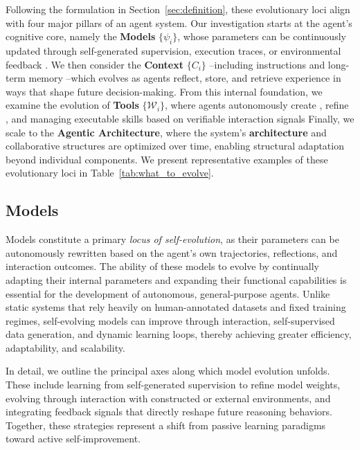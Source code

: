 \documentclass[10pt]{article} %
\begin{document}
Following the formulation in Section~\ref{sec:definition}, 
these evolutionary loci align with four major pillars of an agent system.
Our investigation starts at the agent's cognitive core, namely the \textbf{Models} 
$\{\psi_i\}$,
whose parameters can be continuously updated through self-generated supervision, execution traces, or environmental feedback
\citep{zhou2025selfchallenginglanguagemodelagents, wang2025ragen}. 
We then consider the \textbf{Context} $\{C_i\}$ 
--including instructions
\citep{xiang2025self, khattab2023dspy} 
and long-term memory
\citep{chhikara2025mem0, wang2024agent}
--which evolves as agents reflect, store, and retrieve experience in ways that
shape future decision-making.
From this internal foundation, we 
examine the evolution of
\textbf{Tools} $\{\mathcal{W}_i\}$,
where agents autonomously create
\citep{qiu2025alita}, 
refine
\citep{fromexplorationtomastery}, 
and managing
\citep{wang2025toolgen} 
executable skills based on verifiable interaction signals
Finally, we scale 
to the \textbf{Agentic Architecture}, where the system’s
\textbf{architecture}
\citep{hu2024automated, zhang2024aflow} 
and collaborative structures
\citep{wan2025remalearningmetathinkllms} 
are optimized over time, enabling structural adaptation beyond individual components.
We present 
representative examples of these evolutionary loci in Table~\ref{tab:what_to_evolve}.


\subsection{Models}

Models constitute a primary \emph{locus of self-evolution}, as their parameters can be
autonomously rewritten based on the agent’s own trajectories, reflections, and
interaction outcomes.
The ability of these models to evolve by continually adapting their internal parameters and expanding their functional capabilities
is essential for the development of autonomous, general-purpose agents. 
Unlike static systems that rely heavily on human-annotated datasets and fixed training regimes, 
self-evolving models can improve through interaction, self-supervised data generation, and dynamic learning loops, thereby achieving greater efficiency, adaptability, and scalability.

In detail, we outline the principal axes along which model evolution unfolds. 
These include learning from self-generated supervision to refine model weights, 
evolving through interaction with constructed or external environments, and
integrating feedback signals that directly reshape future reasoning behaviors. Together,
these strategies represent a shift from passive learning paradigms toward active self-improvement.
\end{document}
